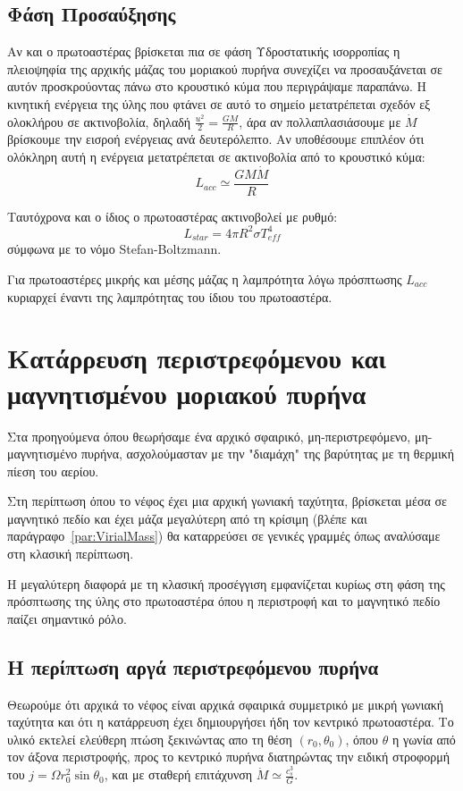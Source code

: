 \documentclass[a4paper,12pt]{memoir}
\begin{document}
\subsection{Φάση Προσαύξησης}
Αν και ο πρωτοαστέρας βρίσκεται πια σε φάση Υδροστατικής ισορροπίας η πλειοψηφία της αρχικής μάζας του μοριακού πυρήνα συνεχίζει να προσαυξάνεται σε αυτόν προσκρούοντας πάνω στο κρουστικό κύμα που περιγράψαμε παραπάνω. 
Η κινητική ενέργεια της ύλης που φτάνει σε αυτό το σημείο μετατρέπεται σχεδόν εξ ολοκλήρου σε ακτινοβολία, δηλαδή $\frac{u^2}{2}=\frac{GM}{R}$, άρα αν πολλαπλασιάσουμε με $\dot{M}$ βρίσκουμε την εισροή ενέργειας ανά δευτερόλεπτο. Αν υποθέσουμε επιπλέον ότι ολόκληρη αυτή η ενέργεια μετατρέπεται σε ακτινοβολία από το κρουστικό κύμα: 
\begin{equation}
L_{acc} \simeq \frac{GM\dot{M}}{R}
\end{equation}

Ταυτόχρονα και ο ίδιος ο πρωτοαστέρας ακτινοβολεί με ρυθμό:
\begin{equation}
L_{star}=4 \pi R^2 \sigma T_{eff} ^4
\end{equation}
σύμφωνα με το νόμο Stefan-Boltzmann.

Για πρωτοαστέρες μικρής και μέσης μάζας η λαμπρότητα λόγω πρόσπτωσης $L_{acc}$ κυριαρχεί έναντι της λαμπρότητας του ίδιου του πρωτοαστέρα.


\section{Κατάρρευση περιστρεφόμενου και μαγνητισμένου μοριακού πυρήνα}
Στα προηγούμενα όπου θεωρήσαμε ένα αρχικό σφαιρικό, μη-περιστρεφόμενο, μη-μαγνητισμένο πυρήνα, ασχολούμασταν με την "διαμάχη" της βαρύτητας με τη θερμική πίεση του αερίου. 

Στη περίπτωση όπου το νέφος έχει μια αρχική γωνιακή ταχύτητα, βρίσκεται μέσα σε μαγνητικό πεδίο και έχει μάζα μεγαλύτερη από τη κρίσιμη (βλέπε και παράγραφο~\ref{par:VirialMass}) θα καταρρεύσει σε γενικές γραμμές όπως αναλύσαμε στη κλασική περίπτωση.

Η μεγαλύτερη διαφορά με τη κλασική προσέγγιση εμφανίζεται κυρίως στη φάση της πρόσπτωσης της ύλης στο πρωτοαστέρα όπου η περιστροφή και το μαγνητικό πεδίο παίζει σημαντικό ρόλο.

\subsection{Η περίπτωση αργά περιστρεφόμενου πυρήνα}
Θεωρούμε ότι αρχικά το νέφος είναι αρχικά σφαιρικά συμμετρικό με μικρή γωνιακή ταχύτητα και ότι η κατάρρευση έχει δημιουργήσει ήδη τον κεντρικό πρωτοαστέρα.
Το υλικό εκτελεί ελεύθερη πτώση ξεκινώντας απο τη θέση $(r_0,\theta _0)$, όπου $\theta$ η γωνία από τον άξονα περιστροφής, προς το κεντρικό πυρήνα διατηρώντας την ειδική στροφορμή του $j=\Omega r_0 ^2 \sin \theta_0$, και με σταθερή επιτάχυνση $\dot{M} \simeq \frac{c_s ^3}{G}$.   
\end{document}
